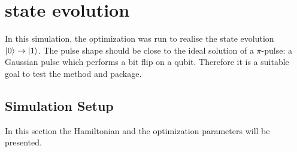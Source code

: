 \documentclass[main.tex]{subfiles}
\begin{document}
\chapter{%
\texorpdfstring{}{0 -> 1} state evolution
}
In this simulation, the optimization was run to realise the state evolution \(\ket{0}\rightarrow\ket{1}\).
The pulse shape should be close to the ideal solution of a \(\pi\)-pulse: a Gaussian pulse which performs a bit flip on a qubit.
Therefore it is a suitable goal to test the method and package.


\section{Simulation Setup}
In this section the Hamiltonian and the optimization parameters will be presented.
\end{document}

